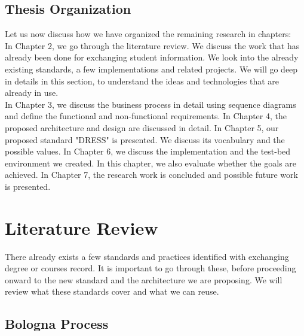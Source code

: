 \documentclass[12pt,a4paper,oneside]{book}
\begin{document}


\section{Thesis Organization}\label{s-thesis-organization}

Let us now discuss how we have organized the remaining research in chapters: \\

In Chapter 2, we go through the literature review. We discuss the work that has already been done for exchanging student information. We look into the already existing standards, a few implementations and related projects. We will go deep in details in this section, to understand the ideas and technologies that are already in use. \\

In Chapter 3, we discuss the business process in detail using sequence diagrams and define the functional and non-functional requirements. In Chapter 4, the proposed architecture and design are discussed in detail. In Chapter 5, our proposed standard "DRESS" is presented. We discuss its vocabulary and the possible values. In Chapter 6, we discuss the implementation and the test-bed environment we created. In this chapter, we also evaluate whether the goals are achieved. In Chapter 7, the research work is concluded and possible future work is presented.

\chapter{Literature Review}\label{ch-work}

There already exists a few standards and practices identified with exchanging degree or courses record. It is important to go through these, before proceeding onward to the new standard and the architecture we are proposing. We will review what these standards cover and what we can reuse. 

\section{Bologna Process}
\end{document}
